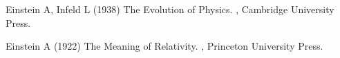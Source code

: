 \item Einstein A, Infeld L (1938) The Evolution of Physics. \textit{}, Cambridge University Press.\item Einstein A (1922) The Meaning of Relativity. \textit{}, Princeton University Press.